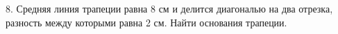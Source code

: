 8. Средняя линия трапеции равна 8 см и делится диагональю на два отрезка, разность между которыми равна 2 см. Найти основания трапеции.\\
